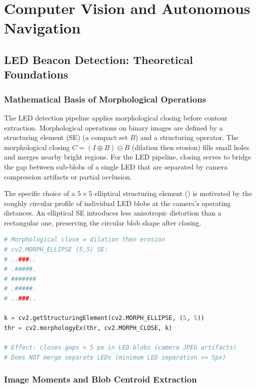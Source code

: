 \chapter{Computer Vision and Autonomous Navigation}
\label{ch:vision-nav}

\section{LED Beacon Detection: Theoretical Foundations}

\subsection{Mathematical Basis of Morphological Operations}

The LED detection pipeline applies morphological closing before contour extraction. Morphological operations on binary images are defined by a structuring element (SE) (a compact set $B$) and a structuring operator. The morphological closing $C = (I \oplus B) \ominus B$ (dilation then erosion) fills small holes and merges nearby bright regions. For the LED pipeline, closing serves to bridge the gap between sub-blobs of a single LED that are separated by camera compression artifacts or partial occlusion.

The specific choice of a $5\times5$ elliptical structuring element () is motivated by the roughly circular profile of individual LED blobs at the camera's operating distances. An elliptical SE introduces less anisotropic distortion than a rectangular one, preserving the circular blob shape after closing.

\begin{lstlisting}[language=Python, caption={Morphological closing with an elliptical structuring element}, label={lst:morph-close}]
# Morphological close = dilation then erosion
# cv2.MORPH_ELLIPSE (5,5) SE:
# ..###..
# .#####.
# #######
# .#####.
# ..###..

k = cv2.getStructuringElement(cv2.MORPH_ELLIPSE, (5, 5))
thr = cv2.morphologyEx(thr, cv2.MORPH_CLOSE, k)

# Effect: closes gaps < 5 px in LED blobs (camera JPEG artifacts)
# Does NOT merge separate LEDs (minimum LED separation >> 5px)
\end{lstlisting}

\subsection{Image Moments and Blob Centroid Extraction}

